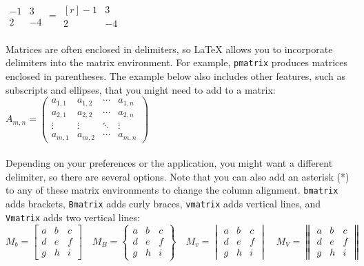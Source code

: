 \documentclass[12pt,notitlepage]{article}		%
\begin{document}
 
$\begin{matrix}
  -1 & 3 \\
  2 & -4
 \end{matrix} $
 \quad
 =
 \quad
 $\begin{matrix*}[r]  %
  -1 & 3 \\
  2 & -4
 \end{matrix*}$\\\\
 
 Matrices are often enclosed in delimiters, so LaTeX allows you to incorporate delimiters into the matrix environment.  For example, \texttt{pmatrix} produces matrices enclosed in parentheses.  The example below also includes other features, such as subscripts and ellipses, that you might need to add to a matrix:\\
 
 
$A_{m,n} = 
 \begin{pmatrix}
  a_{1,1} & a_{1,2} & \cdots & a_{1,n} \\
  a_{2,1} & a_{2,2} & \cdots & a_{2,n} \\
  \vdots  & \vdots  & \ddots & \vdots  \\
  a_{m,1} & a_{m,2} & \cdots & a_{m,n} 
 \end{pmatrix}$\\\\

 

 
 Depending on your preferences or the application, you might want a different delimiter, so there are several options.   Note that you can also add an asterisk (*) to any of these matrix environments to change the column alignment.  \texttt{bmatrix} adds brackets, \texttt{Bmatrix} adds curly braces,  \texttt{vmatrix} adds vertical lines, and  \texttt{Vmatrix} adds two vertical lines:\\
  
 
$M_b = 
\begin{bmatrix}
  a & b & c \\
  d & e & f \\
  g & h & i
 \end{bmatrix}
 \quad
M_B = 
\begin{Bmatrix}
  a & b & c \\
  d & e & f \\
  g & h & i
 \end{Bmatrix}
 \quad
 M_v = 
\begin{vmatrix}
  a & b & c \\
  d & e & f \\
  g & h & i
 \end{vmatrix}
 \quad
 M_V = 
\begin{Vmatrix}
  a & b & c \\
  d & e & f \\
  g & h & i
 \end{Vmatrix}$  \\\\
 
\end{document}
